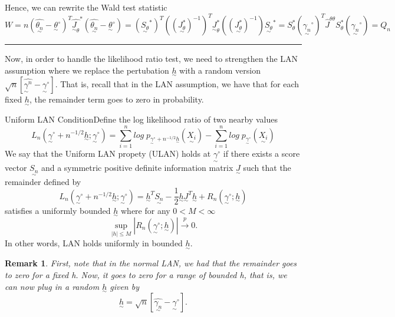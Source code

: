 \documentclass[twoside]{article}
\newtheorem{remark}[theorem]{Remark}
\newenvironment{proof}{{\bf Proof:}}{\hfill\rule{2mm}{2mm}}
\newcommand{\utilde}{\underset{\sim}}
\begin{document}
\begin{proof}
Hence, we can rewrite the Wald test statistic 
\begin{equation}
W = n(\hat{\utilde{\theta_n}} - \utilde{\theta}^{\circ})^T\hat{\utilde{J}_{\theta}}^{*}(\hat{\utilde{\theta_n}} - \utilde{\theta}^{\circ}) = (\utilde{S_{\theta}}^{*})^T ((\utilde{J_{\theta}^{*}})^{-1})^T  \utilde{J}_{\theta}^{*} ((\utilde{J_{\theta}^{*}})^{-1}) \utilde{S_{\theta}}^{*} = S_{\theta}^{*}({\utilde{\gamma_n}}^{\circ})^T\hat{J}^{\theta \theta}S_{\theta}^{*}({\utilde{\gamma_n}}^{\circ}) = Q_n
\tag{3}
\end{equation}

\end{proof}

Now, in order to handle the likelihood ratio test, we need to strengthen the LAN assumption where we replace the pertubation $\utilde{h}$ with a random version $\sqrt{n}[\hat{\utilde{\gamma}^n} - \utilde{\gamma}^{\circ}].$ That is, recall that in the LAN assumption, we have that for each fixed $\utilde{h}$, the remainder term goes to zero in probability. 

\begin{definition_exam}{Uniform LAN Condition}{}Define the log likelihood ratio of two nearby values 
$$
L_n(\utilde{\gamma}^{\circ} + n^{-1/2}\utilde{h}; \utilde{\gamma}^{\circ}) = \sum_{i=1}^{n}log\;p_{\utilde{\gamma}^{\circ} + n^{-1/2}\utilde{h}}(\utilde{X_i}) - \sum_{i=1}^{n}log\;p_{\utilde{\gamma}^{\circ}}(\utilde{X_i}) 
$$
We say that the Uniform LAN propety (ULAN) holds at $\utilde{\gamma}^{\circ}$ if there exists a score vector $\utilde{S_n}$ and a symmetric positive definite information matrix $\utilde{J}$ such that the remainder defined by 
$$
L_n(\utilde{\gamma}^{\circ} + n^{-1/2}\utilde{h}; \utilde{\gamma}^{\circ}) = \utilde{h}^T\utilde{S_n} - \frac{1}{2}\utilde{h}\utilde{J}^T\utilde{h} + R_n(\utilde{\gamma}^{\circ}; \utilde{h})
$$
satisfies a uniformly bounded $\utilde{h}$ where for any $0 < M < \infty$
$$
\sup_{|h| \leq M}|R_n(\utilde{\gamma}^{\circ};\utilde{h})| \xrightarrow{p} 0.
$$
In other words, LAN holds uniformly in bounded $\utilde{h}.$
\end{definition_exam}

\begin{remark}First, note that in the normal LAN, we had that the remainder goes to zero for a fixed h. Now, it goes to zero for a range of bounded h, that is, we can now plug in a random $\utilde{h}$ given by 
$$
\utilde{h} = \sqrt{n}[\hat{\utilde{\gamma_n}} - \utilde{\gamma}^{\circ}].
$$
\end{remark}
\end{document}
